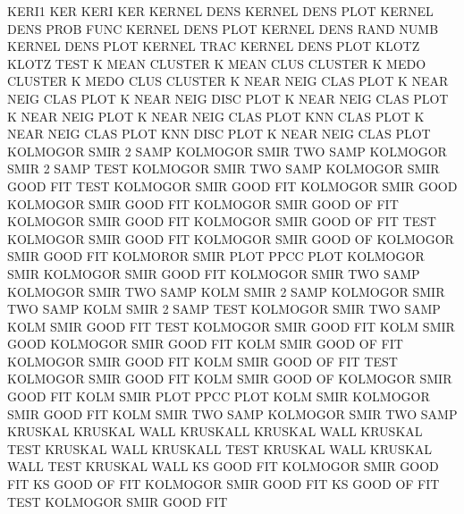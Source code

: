 KERI1                                   KER
KERI                                    KER
KERNEL   DENS                           KERNEL   DENS PLOT
KERNEL   DENS PROB FUNC                 KERNEL   DENS PLOT
KERNEL   DENS RAND NUMB                 KERNEL   DENS PLOT
KERNEL   TRAC                           KERNEL   DENS PLOT
KLOTZ                                   KLOTZ    TEST
K        MEAN                           CLUSTER
K        MEAN CLUS                      CLUSTER
K        MEDO                           CLUSTER
K        MEDO CLUS                      CLUSTER
K        NEAR NEIG CLAS PLOT            K        NEAR NEIG CLAS PLOT
K        NEAR NEIG DISC PLOT            K        NEAR NEIG CLAS PLOT
K        NEAR NEIG PLOT                 K        NEAR NEIG CLAS PLOT
KNN      CLAS PLOT                      K        NEAR NEIG CLAS PLOT
KNN      DISC PLOT                      K        NEAR NEIG CLAS PLOT
KOLMOGOR SMIR 2    SAMP                 KOLMOGOR SMIR TWO  SAMP
KOLMOGOR SMIR 2    SAMP TEST            KOLMOGOR SMIR TWO  SAMP
KOLMOGOR SMIR GOOD FIT  TEST            KOLMOGOR SMIR GOOD FIT
KOLMOGOR SMIR GOOD                      KOLMOGOR SMIR GOOD FIT
KOLMOGOR SMIR GOOD OF   FIT             KOLMOGOR SMIR GOOD FIT
KOLMOGOR SMIR GOOD OF   FIT  TEST       KOLMOGOR SMIR GOOD FIT
KOLMOGOR SMIR GOOD OF                   KOLMOGOR SMIR GOOD FIT
KOLMOROR SMIR PLOT                      PPCC     PLOT
KOLMOGOR SMIR                           KOLMOGOR SMIR GOOD FIT
KOLMOGOR SMIR TWO  SAMP                 KOLMOGOR SMIR TWO  SAMP
KOLM     SMIR 2    SAMP                 KOLMOGOR SMIR TWO  SAMP
KOLM     SMIR 2    SAMP TEST            KOLMOGOR SMIR TWO  SAMP
KOLM     SMIR GOOD FIT  TEST            KOLMOGOR SMIR GOOD FIT
KOLM     SMIR GOOD                      KOLMOGOR SMIR GOOD FIT
KOLM     SMIR GOOD OF   FIT             KOLMOGOR SMIR GOOD FIT
KOLM     SMIR GOOD OF   FIT  TEST       KOLMOGOR SMIR GOOD FIT
KOLM     SMIR GOOD OF                   KOLMOGOR SMIR GOOD FIT
KOLM     SMIR PLOT                      PPCC     PLOT
KOLM     SMIR                           KOLMOGOR SMIR GOOD FIT
KOLM     SMIR TWO  SAMP                 KOLMOGOR SMIR TWO  SAMP
KRUSKAL                                 KRUSKAL  WALL
KRUSKALL                                KRUSKAL  WALL
KRUSKAL  TEST                           KRUSKAL  WALL
KRUSKALL TEST                           KRUSKAL  WALL
KRUSKAL  WALL TEST                      KRUSKAL  WALL
KS       GOOD FIT                       KOLMOGOR SMIR GOOD FIT
KS       GOOD OF   FIT                  KOLMOGOR SMIR GOOD FIT
KS       GOOD OF   FIT  TEST            KOLMOGOR SMIR GOOD FIT
